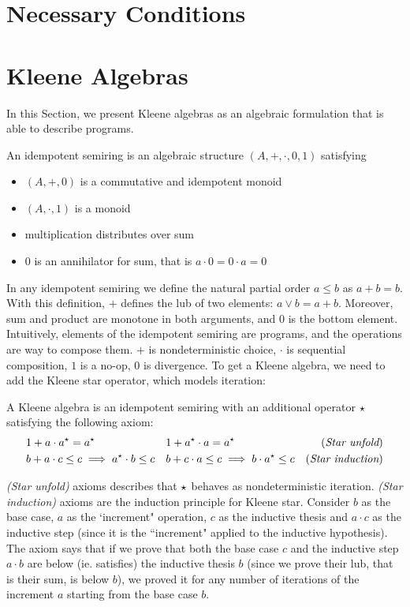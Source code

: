 \section{Necessary Conditions}\label{sec:bg:nc}

\section{Kleene Algebras}\label{sec:bg:algebra}
In this Section, we present Kleene algebras as an algebraic formulation that is able to describe programs.

\begin{definition}\label{def:bg:i-semiring}
	An idempotent semiring is an algebraic structure $(A, +, \cdot, 0, 1)$ satisfying
	\begin{itemize}
		\item $(A, +, 0)$ is a commutative and idempotent monoid
		\item $(A, \cdot, 1)$ is a monoid
		\item multiplication distributes over sum
		\item $0$ is an annihilator for sum, that is $a \cdot 0 = 0 \cdot a = 0$
	\end{itemize}
\end{definition}
In any idempotent semiring we define the natural partial order $a \le b$ as $a + b = b$. With this definition, $+$ defines the lub of two elements: $a \vee b = a + b$. Moreover, sum and product are monotone in both arguments, and $0$ is the bottom element.
Intuitively, elements of the idempotent semiring are programs, and the operations are way to compose them. $+$ is nondeterministic choice, $\cdot$ is sequential composition, $1$ is a no-op, $0$ is divergence. To get a Kleene algebra, we need to add the Kleene star operator, which models iteration:
\begin{definition}\label{def:bg:kleene-algebra}
	A Kleene algebra is an idempotent semiring with an additional operator $\star$ satisfying the following axiom:
	\begin{align*}
		 & 1 + a \cdot a^\star = a^\star                     &  & 1 + a^\star \cdot a = a^\star                     & (\textit{Star unfold})    \\
		 & b + a \cdot c \le c \implies a^\star \cdot b \le c &  & b + c \cdot a \le c \implies b \cdot a^\star \le c & (\textit{Star induction})
	\end{align*}
\end{definition}
\textit{(Star unfold)} axioms describes that $\star$ behaves as nondeterministic iteration. \textit{(Star induction)} axioms are the induction principle for Kleene star. Consider $b$ as the base case, $a$ as the `increment" operation, $c$ as the inductive thesis and $a \cdot c$ as the inductive step (since it is the ``increment" applied to the inductive hypothesis). The axiom says that if we prove that both the base case $c$ and the inductive step $a \cdot b$ are below (ie. satisfies) the inductive thesis $b$ (since we prove their lub, that is their sum, is below $b$), we proved it for any number of iterations of the increment $a$ starting from the base case $b$.

